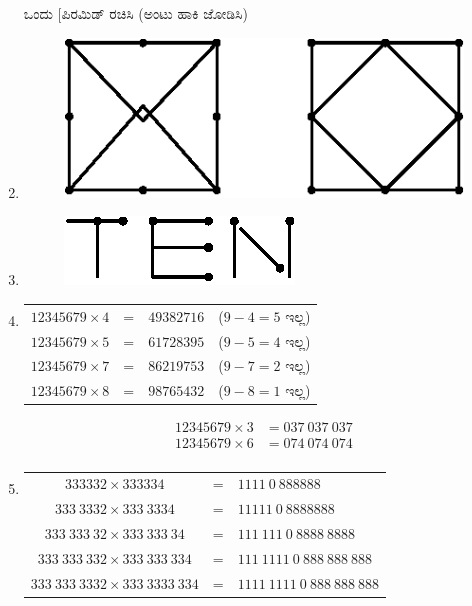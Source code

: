 \begin{enumerate}
ಒಂದು [ಪಿರಮಿಡ್ ರಚಿಸಿ (ಅಂಟು ಹಾಕಿ ಜೋಡಿಸಿ)

\item 
\begin{figure}[H]
\centering
\includegraphics{images/chap12/ans11.eps}
\end{figure}

\item 
\begin{figure}[H]
\centering
\includegraphics{images/chap12/ans12.eps}
\end{figure}

\item 
\begin{tabular}[t]{llll}
$12345679\times 4$ & = & $49382716$ & ($9-4 = 5$ ಇಲ್ಲ)\\
$12345679\times 5$ & = & $61728395$ & ($9-5 = 4$ ಇಲ್ಲ)\\
$12345679\times 7$ & = & $86219753$ & ($9-7 = 2$ ಇಲ್ಲ)\\
$12345679\times 8$ & = & $98765432$ & ($9-8 = 1$ ಇಲ್ಲ)
\end{tabular}
\begin{align*}
12345679\times 3 & = 037~037~037\\
12345679\times 6 & = 074~074~074\\ 
\end{align*}

\item 
\begin{tabular}[t]{ccl}
$333332\times 333334$ & = & $1111~0~888888$\\
$333~3332\times 333~3334$ & = & $11111~0~8888888$\\
$333~333~32\times 333~333~34$ & = & $111~111~0~8888~8888$\\
$333~333~332\times 333~333~334$ & = & $111~1111~0~888~888~888$\\
$333~333~3332\times 333~3333~334$ & = & $1111~1111~0~888~888~888$\\
\end{tabular}


\end{enumerate}
